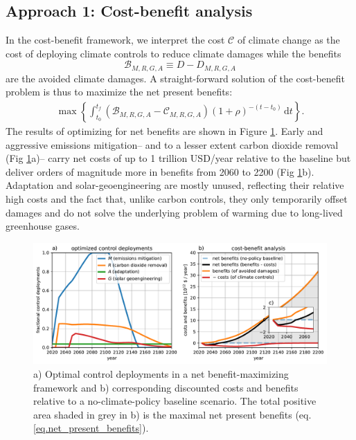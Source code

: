 \documentclass{article}
\begin{document}
\subsection{Approach 1: Cost-benefit analysis}\label{sec.cost_benefit}

In the cost-benefit framework, we interpret the cost $\mathcal{C}$ of climate change as the cost of deploying climate controls to reduce climate damages while the benefits 
\begin{equation}
    \mathcal{B}_{M, R, G, A} \equiv D-D_{M, R, G, A}
\end{equation}
are the avoided climate damages. A straight-forward solution of the cost-benefit problem is thus to maximize the net present benefits:
\begin{gather}
    \max \left\{ \int_{t_{0}}^{t_{f}} 
    \left(\mathcal{B}_{M, R, G, A} - \mathcal{C}_{M, R, G, A} \right) (1 + \rho)^{-(t-t_{0})} \, \text{d}t \right\}.
    \label{eq.net_present_benefits}
\end{gather}
The results of optimizing for net benefits are shown in Figure \ref{fig.approach1}. Early and aggressive emissions mitigation– and to a lesser extent carbon dioxide removal (Fig \ref{fig.approach1}a)– carry net costs of up to 1 trillion USD/year relative to the baseline but deliver orders of magnitude more in benefits from 2060 to 2200 (Fig \ref{fig.approach1}b). Adaptation and solar-geoengineering are mostly unused, reflecting their relative high costs and the fact that, unlike carbon controls, they only temporarily offset damages and do not solve the underlying problem of warming due to long-lived greenhouse gases.

\begin{figure}[htb!]
\noindent\includegraphics[width=1.0\textwidth]{figures/default-benefits_controls_and_benefits.pdf}
\centering
\caption{a) Optimal control deployments in a net benefit-maximizing framework and b) corresponding discounted costs and benefits relative to a no-climate-policy baseline scenario. The total positive area shaded in grey in b) is the maximal net present benefits (eq. \ref{eq.net_present_benefits}).}
\label{fig.approach1}
\end{figure}
\end{document}
